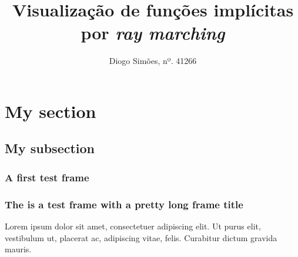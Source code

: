 \documentclass[pdflatex,compress,aspectratio=169]{beamer}
\title{Visualização de funções implícitas por \textit{ray marching}}
\author{Diogo Simões, nº. 41266}
\begin{document}
\maketitle

\section{My section}
\subsection{My subsection}

\begin{frame}
\frametitle{A first test frame}


\end{frame}



\begin{frame}

\frametitle{The is a test frame with a pretty long frame title}
Lorem ipsum dolor sit amet, consectetuer adipiscing elit. Ut purus
elit, vestibulum ut, placerat ac, adipiscing vitae, felis. Curabitur
dictum gravida mauris.

\end{frame}
\end{document}
